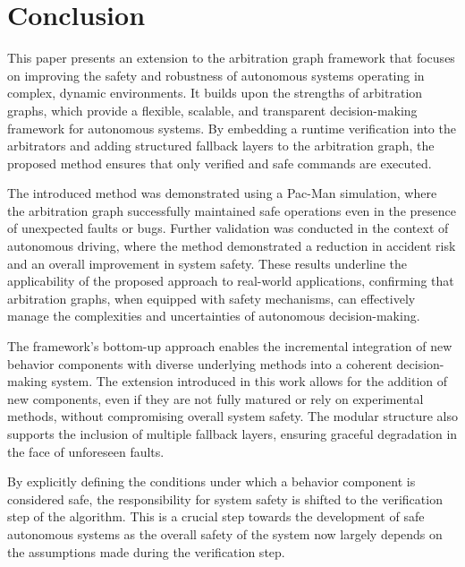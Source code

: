\section{Conclusion}
This paper presents an extension to the arbitration graph framework that focuses on improving the safety and robustness of autonomous systems operating in complex, dynamic environments.
It builds upon the strengths of arbitration graphs, which provide a flexible, scalable, and transparent decision-making framework for autonomous systems.
By embedding a runtime verification into the arbitrators and adding structured fallback layers to the arbitration graph,
the proposed method ensures that only verified and safe commands are executed.

The introduced method was demonstrated using a Pac-Man simulation, where the arbitration graph successfully maintained safe operations even in the presence of unexpected faults or bugs.
%
Further validation was conducted in the context of autonomous driving, where the method demonstrated a reduction in accident risk and an overall improvement in system safety.
These results underline the applicability of the proposed approach to real-world applications, confirming that arbitration graphs, when equipped with safety mechanisms, can effectively manage the complexities and uncertainties of autonomous decision-making.

The framework’s bottom-up approach enables the incremental integration of new behavior components with diverse underlying methods into a coherent decision-making system.
The extension introduced in this work allows for the addition of new components, even if they are not fully matured or rely on experimental methods, without compromising overall system safety.
The modular structure also supports the inclusion of multiple fallback layers, ensuring graceful degradation in the face of unforeseen faults.

By explicitly defining the conditions under which a behavior component is considered safe, the responsibility for system safety is shifted to the verification step of the algorithm.
This is a crucial step towards the development of safe autonomous systems as the overall safety of the system now largely depends on the assumptions made during the verification step.

